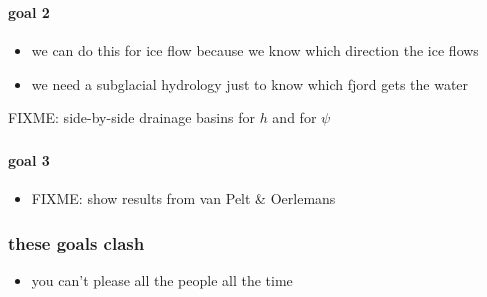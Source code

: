 \documentclass[hide notes,intlimits]{beamer}
\begin{document}
\begin{frame}
  \frametitle{\goaltitle}
  \framesubtitle{goal 2}
 
\begin{center}
\end{center}
  
  \begin{itemize}
    \item we can do this for ice flow because we know which direction the ice flows
    \item we need a subglacial hydrology just to know which fjord gets the water
  \end{itemize}

\begin{center}
\bigskip

    FIXME: side-by-side drainage basins for $h$ and for $\psi$
\end{center}

\end{frame}


\begin{frame}
  \frametitle{\goaltitle}
  \framesubtitle{goal 3}

\begin{center}
\end{center}
  
  \begin{itemize}
    \item FIXME:  show results from van Pelt \& Oerlemans
  \end{itemize}
\end{frame}



\begin{frame}
  \frametitle{these goals clash}

\begin{itemize}
\item you can't please all the people all the time
\end{itemize}
\end{frame}
\end{document}
